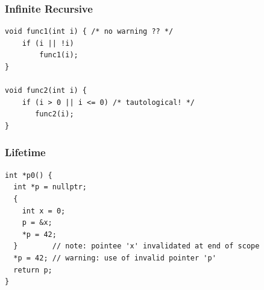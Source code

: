 \begin{frame}[fragile]
    \frametitle{Infinite Recursive}
    \begin{center}
        \begin{minipage}{0.7\textwidth}
            \begin{lstlisting}[caption=无限递归诊断\cite{lyc-infrec-2019}]
void func1(int i) { /* no warning ?? */
    if (i || !i)
        func1(i);
}

void func2(int i) {
    if (i > 0 || i <= 0) /* tautological! */
       func2(i);
}
            \end{lstlisting}
        \end{minipage}
    \end{center}
\end{frame}

\begin{frame}[fragile]
    \frametitle{Lifetime}
    \begin{center}
        \begin{minipage}{0.8\textwidth}
            \begin{lstlisting}[caption=生命周期分析与垂悬引用]
int *p0() {
  int *p = nullptr;
  {
    int x = 0;
    p = &x;
    *p = 42;
  }        // note: pointee 'x' invalidated at end of scope
  *p = 42; // warning: use of invalid pointer 'p'
  return p;
}
            \end{lstlisting}

        \end{minipage}
    \end{center}

\end{frame}
